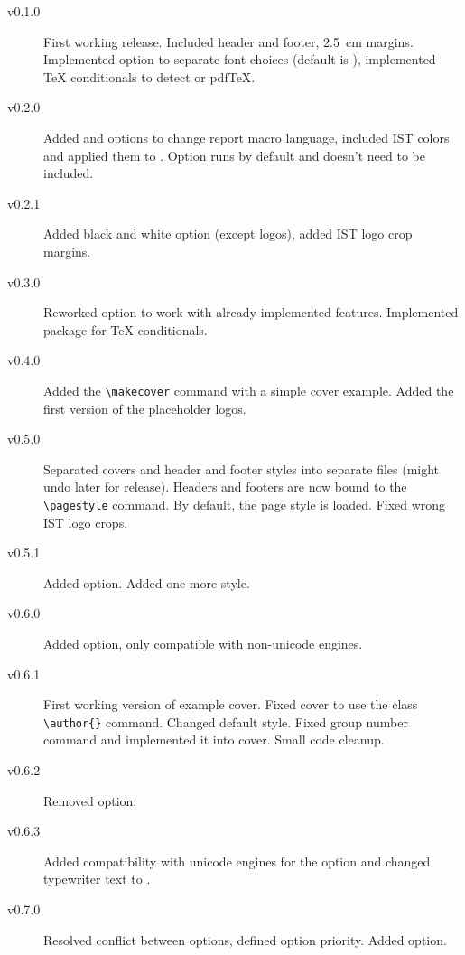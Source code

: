 \documentclass[palatino,english]{ist-report}
\begin{document}
\begin{description}
	\item [v0.1.0] First working release. Included header and footer, \SI{2.5}{\centi\meter} margins. Implemented  option to separate font choices (default is ), implemented \TeX{} conditionals to detect \XeTeX{} or pdf\TeX{}.
	\item [v0.2.0] Added  and  options to change report macro language, included IST colors and applied them to . Option  runs by default and doesn't need to be included.
	\item [v0.2.1] Added black and white option (except logos), added IST logo crop margins.
	\item [v0.3.0] Reworked  option to work with already implemented features. Implemented  package for \TeX{} conditionals.
	\item [v0.4.0] Added the \verb|\makecover| command with a simple cover example. Added the first version of the placeholder logos.
	\item [v0.5.0] Separated covers and header and footer styles into separate files (might undo later for release). Headers and footers are now bound to the \verb|\pagestyle| command. By default, the  page style is loaded. Fixed wrong IST logo crops.
	\item [v0.5.1] Added  option. Added one more style.
	\item [v0.6.0] Added  option, only compatible with non-unicode engines.
	\item [v0.6.1] First working version of example cover. Fixed cover to use the  class \verb|\author{}| command. Changed default style. Fixed group number command and implemented it into cover. Small code cleanup.
	\item [v0.6.2] Removed  option.
	\item [v0.6.3] Added compatibility with unicode engines for the  option and changed typewriter text to .
	\item [v0.7.0] Resolved conflict between options, defined option priority. Added  option.
\end{description}

\printbibliography
\end{document}
